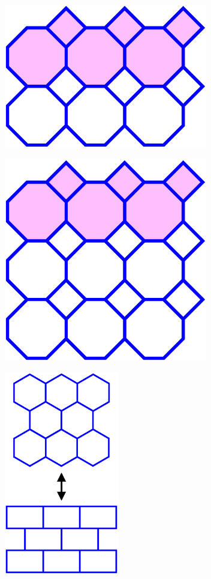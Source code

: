 \documentclass{beamer}
\begin{document}
\begin{frame}
  \begin{center}
    \includegraphics[width=3.5in]{periodic4}
  \end{center}
\end{frame}

\begin{frame}
  \begin{center}
    \includegraphics[width=3.5in]{periodic5}
  \end{center}
\end{frame}

\begin{frame}
  \begin{center}
    \includegraphics[height=3.5in]{topol-equiv-alt}
  \end{center}
\end{frame}
\end{document}
